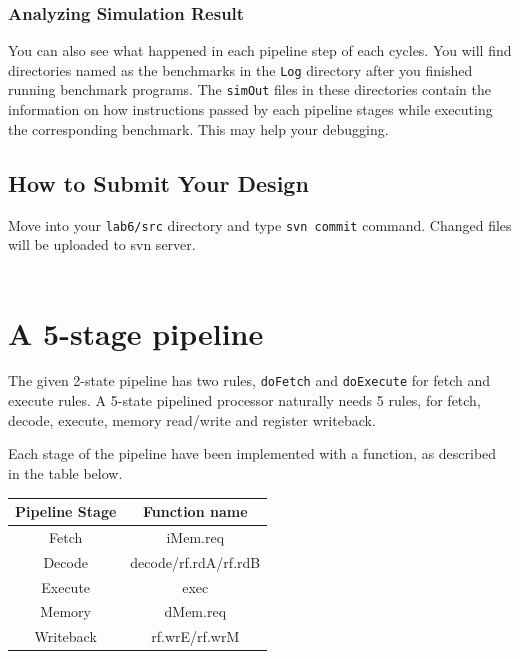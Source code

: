 \documentclass{article}
\begin{document}
\subsubsection{Analyzing Simulation Result}
You can also see what happened in each pipeline step of each cycles.
You will find directories named as the benchmarks in the \texttt{Log} directory
after you finished running benchmark programs. The \texttt{simOut} files in these
directories contain the information on how instructions passed by each pipeline stages
while executing the corresponding benchmark. This may help your debugging.

\subsection{How to Submit Your Design}
Move into your \texttt{lab6/src} directory and type \texttt{svn commit} command.
Changed files will be uploaded to svn server.\\\\

\newpage
\section{A 5-stage pipeline}

The given 2-state pipeline has two rules, \texttt{doFetch} and
\texttt{doExecute} for fetch and execute rules. A 5-state pipelined
processor naturally needs 5 rules, for fetch, decode,
execute, memory read/write and register writeback.

Each stage of the pipeline have been implemented with a function, as
described in the table below.

\begin{table}[h]
\centering
\begin{tabular}{|c|c|}
\hline
Pipeline Stage & Function name \\
\hline
Fetch & iMem.req \\
Decode & decode/rf.rdA/rf.rdB \\
Execute & exec \\
Memory & dMem.req \\
Writeback & rf.wrE/rf.wrM \\
\hline
\end{tabular}
\end{table}

\end{document}
